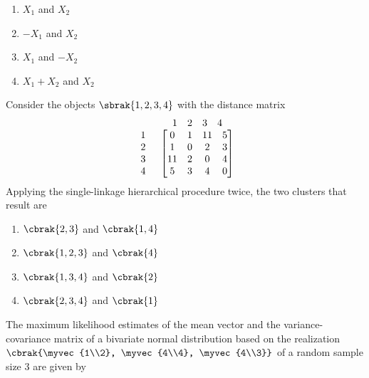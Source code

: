 			\begin{enumerate}
				\item $X_1$ and $X_2$
				\item $-X_1$ and $X_2$
				\item $X_1$ and $-X_2$
				\item $X_1 + X_2$ and $X_2$
			\end{enumerate}
		\item Consider the objects $\sbrak{1, 2, 3, 4}$ with the distance matrix 
			\begin{align*}
				\begin{array}{cc}
					& \begin{array}{c c c c} 1 & 2 & 3 & 4 \end{array}\\
						\begin{array}{c}
							1 \\ 
							2 \\
							3 \\
							4
						\end{array} &
						\begin{bmatrix}
							0 & 1 & 11 & 5 \\
							1 & 0 & 2 & 3 \\
							11 & 2 & 0 & 4 \\
							5 & 3 & 4 & 0
						\end{bmatrix}
				\end{array}
			\end{align*}
Applying the single-linkage hierarchical procedure twice, the two clusters that result are
\begin{enumerate}
    \item $\cbrak{2, 3}$ and $\cbrak{1, 4}$
    \item $\cbrak{1, 2, 3}$ and $\cbrak{4}$
    \item $\cbrak{1, 3, 4}$ and $\cbrak{2}$
    \item $\cbrak{2, 3, 4}$ and $\cbrak{1}$
\end{enumerate}
\item The maximum likelihood estimates of the mean vector and the variance-covariance matrix of a bivariate normal distribution based on the realization $\cbrak{\myvec{1\\2}, \myvec{4\\4}, \myvec{4\\3}}$ of a random sample size 3 are given by
